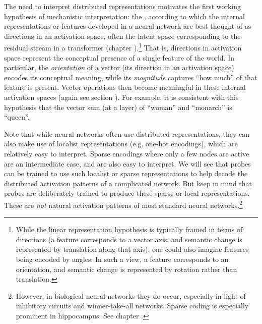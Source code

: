 The need to interpret distributed representations motivates the first working
hypothesis of mechanistic interpretation: the , according to which the internal representations or features
developed in a neural network are best thought of as directions in an
activation space, often the latent space corresponding to the residual stream
in a transformer (chapter ).\footnote{While the linear representation hypothesis is typically framed in terms of directions (a feature corresponds to a vector axis, and semantic change is represented by translation along that axis), one could also imagine features being encoded by angles. In such a view, a feature corresponds to an orientation, and semantic change is represented by rotation rather than translation.} That is, directions in
activation space represent the conceptual presence of a single feature of the
world. In particular, the \emph{orientation} of a vector (its direction in an
activation space) encodes its conceptual meaning, while its \emph{magnitude}
captures ``how much'' of that feature is present. Vector operations then become
meaningful in these internal activation spaces (again see section
). For example, it is consistent with this
hypothesis that the vector sum (at a layer) of ``woman'' and ``monarch'' is
``queen''.

Note that while neural networks often use distributed representations, they can
also make use of localist representations (e.g. one-hot encodings), which are
relatively easy to interpret. Sparse encodings where only a few nodes are active are
an intermediate case, and are also easy to interpret. We will see that probes
can be trained to use such localist or sparse representations to help decode the
distributed activation patterns of a complicated network. But keep in mind that probes are deliberately trained to produce these sparse or local representations. These are \emph{not} natural activation patterns of most standard neural networks.\footnote{However, in biological neural networks they do occur, especially in light of inhibitory circuits and winner-take-all networks. Sparse coding is especially prominent in hippocampus. See chapter .}

